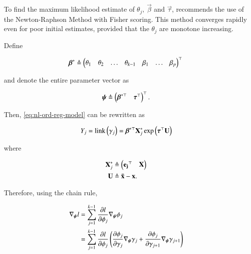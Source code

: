 \documentclass[journal,12pt,twocolumn]{IEEEtran}
\begin{document}
To find the maximum likelihood estimate of \(\theta_j,\ \vec{\beta}\) and
\(\vec{\tau}\), \cite{PMC80} recommends the use of the Newton-Raphson Method
with Fisher scoring. This method converges rapidly even for poor initial
estimates, provided that the \(\theta_j\) are monotone increasing.

Define

\begin{equation}
     \vec{\beta}^* \triangleq \myvec{\theta_1 & \theta_2 & \ldots & \theta_{k-1} & \beta_1 & \ldots & \beta_p}^\top \\
     \label{eq:beta-star-def}
\end{equation}

and denote the entire parameter vector as

\begin{equation}
     \vec{\psi} \triangleq \myvec{\vec{\beta}^{*\top} & \vec{\tau}^\top}^\top.
     \label{eq:psi-def}
\end{equation}

Then, \eqref{eq:nl-ord-reg-model} can be rewritten as

\begin{equation}
     Y_j = \mathrm{link}\brak{\gamma_j} = \vec{\beta}^{*\top}\vec{X}^*_j\exp\brak{\vec{\tau}^\top\vec{U}}
     \label{eq:nl-ord-reg-ll}
\end{equation}

where

\begin{align}
     \vec{X}^*_j &\triangleq \myvec{\vec{e_j}^\top & \vec{X}} \\
     \vec{U} &\triangleq \vec{\bar{x}} - \vec{x}.
\end{align}

Therefore, using the chain rule,

\begin{align}
     \grad{\vec{\psi}}{l} &= \sum_{j=1}^{k-1} \pdiff{\phi_j}{l}\grad{\vec{\psi}}{\phi_j} \\
                          &= \sum_{j=1}^{k-1} \pdiff{\phi_j}{l}\brak{\pdiff{\gamma_j}{\phi_j}\grad{\vec{\psi}}{\gamma_j} + \pdiff{\gamma_{j+1}}{\phi_j}\grad{\vec{\psi}}{\gamma_{j+1}}} \\ 
\end{align}


\end{document}
